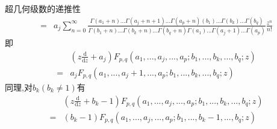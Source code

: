\documentclass[zihao=-4,a4paper]{ctexart}
\begin{document}
\begin{mtheorem}{超几何级数的递推性}
\begin{equation*}
\begin{split}
			=&{a}_{j} \sum^{\infty}_{n=0} \frac{ {\Gamma} { \left( {a}_{1} + {n} \right) } ... {\Gamma} { \left( {a}_{j} + {n} + {1} \right) } ... {\Gamma} { \left( {a}_{p} + {n} \right) } { \left( {b}_{1} \right) } ... {\Gamma} { \left( {b}_{k} \right) } ... {\Gamma} { \left( {b}_{q} \right) } } { {\Gamma} { \left( {b}_{1} + {n} \right) } ... {\Gamma} { \left( {b}_{k} + {n} \right) } ... {\Gamma} { \left( {b}_{q} + {n} \right) } {\Gamma} { \left( {a}_{1} \right) } ... {\Gamma} { \left( {a}_{j} + {1} \right) } ... {\Gamma} { \left( {a}_{p} \right) } } \frac{ {z}^{n} }{ {n} ! }
		\end{split}
	\end{equation*}
	即
	\begin{equation}
		\begin{split}
			&\left( {z} \frac{ \text{d} }{ \text{d} {z} } + {a}_{j} \right) {F}_{ {p} , {q} } \left( {a}_{1} , ... , {a}_{j} , ... , {a}_{p} ; {b}_{1} , ... , {b}_{k} , ... , {b}_{q} ; {z} \right)\\
			=&{a}_{j} {F}_{ {p} , {q} } \left( {a}_{1} , ... , {a}_{j} + {1} , ... , {a}_{p} ; {b}_{1} , ... , {b}_{k} , ... , {b}_{q} ; {z} \right)
		\end{split}
	\end{equation}
	同理,对${b}_{k} \left( {b}_{k} {\neq} {1} \right)$有
	\begin{equation}
		\begin{split}
			&\left( {z} \frac{ \text{d} }{ \text{d} {z} } + {b}_{k} - {1} \right) {F}_{ {p} , {q} } \left( {a}_{1} , ... , {a}_{j} , ... , {a}_{p} ; {b}_{1} , ... , {b}_{k} , ... , {b}_{q} ; {z} \right)\\
			=&\left( {b}_{k} - {1} \right) {F}_{ {p} , {q} } \left( {a}_{1} , ... , {a}_{j} , ... , {a}_{p} ; {b}_{1} , ... , {b}_{k} - {1} , ... , {b}_{q} ; {z} \right)
		\end{split}
	\end{equation}
\end{mtheorem}
\end{document}
